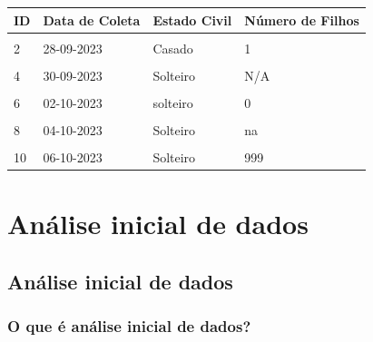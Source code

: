 \documentclass[
]{book}
\begin{document}
\begin{tabu} to 
\toprule
\textbf{ID} & \textbf{Data de Coleta} & \textbf{Estado Civil} & \textbf{Número de Filhos}\\
\midrule
{} &  &  & \\
2 & 28-09-2023 & Casado & 1\\
 &  &  & \\
4 & 30-09-2023 & Solteiro & N/A\\
 &  &  & \\
6 & 02-10-2023 & solteiro & 0\\
 &  &  & \\
8 & 04-10-2023 & Solteiro & na\\
 &  &  & \\
10 & 06-10-2023 & Solteiro & 999\\
\bottomrule
\end{tabu}

\hypertarget{analise-inicial-dados}{%
\chapter{\texorpdfstring{\textbf{Análise inicial de dados}}{Análise inicial de dados}}\label{analise-inicial-dados}}

\hypertarget{analise-inicial}{%
\section{Análise inicial de dados}\label{analise-inicial}}

\hypertarget{o-que-uxe9-anuxe1lise-inicial-de-dados}{%
\subsection{O que é análise inicial de dados?}\label{o-que-uxe9-anuxe1lise-inicial-de-dados}}
\end{document}
